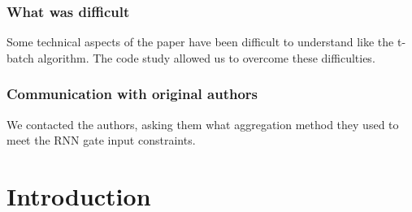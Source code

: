 \subsubsection{What was difficult}
Some technical aspects of the paper have been difficult to understand like the t-batch algorithm. The code study allowed us to overcome these difficulties.

\subsubsection{Communication with original authors}
We contacted the authors, asking them what aggregation method they used to meet the RNN gate input constraints.

\newpage

\section{Introduction}

